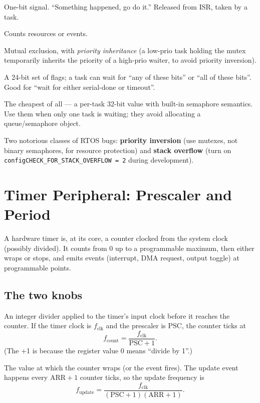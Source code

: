 \documentclass[11pt,a4paper]{article}
\begin{document}
\begin{description}[leftmargin=*, style=nextline]
    \item[Binary semaphore.] One-bit signal. ``Something happened, go do it.''
    Released from ISR, taken by a task.
    \item[Counting semaphore.] Counts resources or events.
    \item[Mutex.] Mutual exclusion, with \emph{priority inheritance}
    (a low-prio task holding the mutex temporarily inherits the priority of
    a high-prio waiter, to avoid priority inversion).
    \item[Event group.] A 24-bit set of flags; a task can wait for ``any of
    these bits'' or ``all of these bits''. Good for ``wait for either
    serial-done or timeout''.
    \item[Direct task notifications.] The cheapest of all --- a per-task
    32-bit value with built-in semaphore semantics. Use them when only one
    task is waiting; they avoid allocating a queue/semaphore object.
\end{description}

\begin{warning}
Two notorious classes of RTOS bugs: \textbf{priority inversion} (use mutexes,
not binary semaphores, for resource protection) and \textbf{stack overflow}
(turn on \texttt{configCHECK\_FOR\_STACK\_OVERFLOW = 2} during development).
\end{warning}

\section{Timer Peripheral: Prescaler and Period}

A hardware timer is, at its core, a counter clocked from the system clock
(possibly divided). It counts from 0 up to a programmable maximum, then
either wraps or stops, and emits events (interrupt, DMA request, output
toggle) at programmable points.

\subsection{The two knobs}

\begin{description}[leftmargin=*, style=nextline]
    \item[Prescaler (PSC).] An integer divider applied to the timer's
    input clock before it reaches the counter. If the timer clock is
    $f_{\text{clk}}$ and the prescaler is $\text{PSC}$, the counter ticks
    at
    \[
    f_{\text{count}} = \frac{f_{\text{clk}}}{\text{PSC} + 1}.
    \]
    (The +1 is because the register value 0 means ``divide by 1''.)
    \item[Period / Auto-Reload Register (ARR).] The value at which the
    counter wraps (or the event fires). The update event happens every
    $\text{ARR}+1$ counter ticks, so the update frequency is
    \[
    f_{\text{update}} = \frac{f_{\text{clk}}}{(\text{PSC}+1)(\text{ARR}+1)}.
    \]
\end{description}
\end{document}
